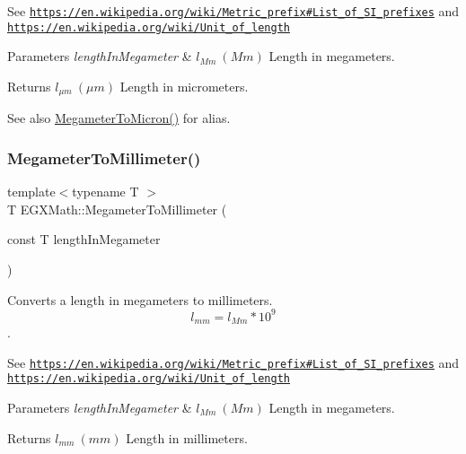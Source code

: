 See \href{https://en.wikipedia.org/wiki/Metric_prefix#List_of_SI_prefixes}{\tt https\+://en.\+wikipedia.\+org/wiki/\+Metric\+\_\+prefix\#\+List\+\_\+of\+\_\+\+S\+I\+\_\+prefixes} and \href{https://en.wikipedia.org/wiki/Unit_of_length}{\tt https\+://en.\+wikipedia.\+org/wiki/\+Unit\+\_\+of\+\_\+length} 
\begin{DoxyParams}{Parameters}
{\em length\+In\+Megameter} & $ l_{Mm}\ (Mm)$ Length in megameters. \\
\hline
\end{DoxyParams}
\begin{DoxyReturn}{Returns}
$ l_{\mu m}\ (\mu m)$ Length in micrometers. 
\end{DoxyReturn}
\begin{DoxySeeAlso}{See also}
\mbox{\hyperlink{group___e_g_x_math-_conversions-_length_conversions-_s_i-_megameter-_non-_s_i_ga14e6b356b28257b1bde9cb9ebf6bc3c6}{Megameter\+To\+Micron()}} for alias. 
\end{DoxySeeAlso}
\mbox{\label{group___e_g_x_math-_conversions-_length_conversions-_s_i-_megameter-_s_i_ga8fd5a24935e05ff3f6e0f7e35379357f}} 
\subsubsection{\texorpdfstring{Megameter\+To\+Millimeter()}{MegameterToMillimeter()}}
{\footnotesize\ttfamily template$<$typename T $>$ \\
T E\+G\+X\+Math\+::\+Megameter\+To\+Millimeter (\begin{DoxyParamCaption}\item[{const T}]{length\+In\+Megameter }\end{DoxyParamCaption})}



Converts a length in megameters to millimeters. \[ l_{mm}=l_{Mm} * 10^{9} \]. 

See \href{https://en.wikipedia.org/wiki/Metric_prefix#List_of_SI_prefixes}{\tt https\+://en.\+wikipedia.\+org/wiki/\+Metric\+\_\+prefix\#\+List\+\_\+of\+\_\+\+S\+I\+\_\+prefixes} and \href{https://en.wikipedia.org/wiki/Unit_of_length}{\tt https\+://en.\+wikipedia.\+org/wiki/\+Unit\+\_\+of\+\_\+length} 
\begin{DoxyParams}{Parameters}
{\em length\+In\+Megameter} & $ l_{Mm}\ (Mm)$ Length in megameters. \\
\hline
\end{DoxyParams}
\begin{DoxyReturn}{Returns}
$ l_{mm}\ (mm)$ Length in millimeters. 
\end{DoxyReturn}
\mbox{\label{group___e_g_x_math-_conversions-_length_conversions-_s_i-_megameter-_s_i_ga4b35e7fac8eeb2e9e6db36a4c63e3073}} 
